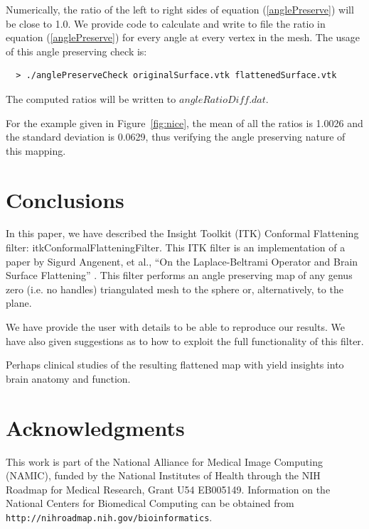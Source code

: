 \documentclass{InsightArticle}
\begin{document}
  Numerically, the ratio of the left to right sides of equation
  (\ref{anglePreserve}) will be close to 1.0. We provide code to
  calculate and write to file the ratio in equation
  (\ref{anglePreserve}) for every angle at every vertex in the
  mesh. The usage of this angle preserving check is:
  \begin{verbatim}
  > ./anglePreserveCheck originalSurface.vtk flattenedSurface.vtk
  \end{verbatim}
  \noindent The computed ratios will be written to
  $angleRatioDiff.dat$. 

  For the example given in Figure~\ref{fig:nice}, the mean of all the
  ratios is 1.0026 and the standard deviation is 0.0629, thus
  verifying the angle preserving nature of this mapping.
  
	\section{Conclusions}
	In this paper, we have described the Insight Toolkit (ITK) Conformal
	Flattening filter: itkConformalFlatteningFilter. This ITK filter is
	an implementation of a paper by Sigurd Angenent, et al., ``On the
	Laplace-Beltrami Operator and Brain Surface Flattening''
	\cite{angenent1999lbo}. This filter performs an angle preserving map
	of any genus zero (i.e. no handles) triangulated mesh to the sphere
	or, alternatively, to the plane.

	We have provide the user with details to be able to reproduce our
	results. We have also given suggestions as to how to exploit the
	full functionality of this filter.

	Perhaps clinical studies of the resulting flattened map with yield
	insights into brain anatomy and function.

	\section*{Acknowledgments}
	This work is part of the National Alliance for Medical Image
	Computing (NAMIC), funded by the National Institutes of Health
	through the NIH Roadmap for Medical Research, Grant U54 EB005149.
	Information on the National Centers for Biomedical Computing can be
	obtained from {\tt http://nihroadmap.nih.gov/bioinformatics}.

\end{document}
